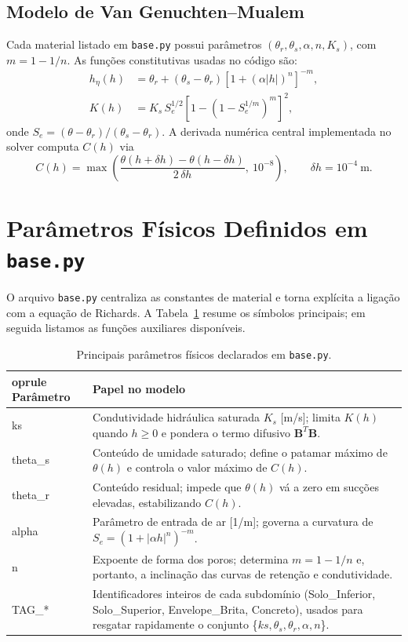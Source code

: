 \documentclass[a4paper,12pt]{article}
\begin{document}
\subsection{Modelo de Van Genuchten--Mualem}
Cada material listado em \texttt{base.py} possui parâmetros $(\theta_r,\theta_s,\alpha,n,K_s)$, com $m = 1 - 1/n$. As funções constitutivas usadas no código são:
\begin{align}
    	h_{\eta}(h) &= \theta_r + (\theta_s - \theta_r)\left[1 + (\alpha |h|)^n\right]^{-m},\\
    K(h) &= K_s\, S_e^{1/2}\left[1 - \left(1 - S_e^{1/m}\right)^m\right]^2,
\end{align}
onde $S_e = (\theta - \theta_r)/(\theta_s - \theta_r)$. A derivada numérica central implementada no solver computa $C(h)$ via
\begin{equation}
    C(h) = \max\left( \frac{\theta(h + \delta h) - \theta(h - \delta h)}{2\,\delta h} ,\ 10^{-8} \right), \qquad \delta h = 10^{-4}\ \text{m}.
\end{equation}

\section{Parâmetros Físicos Definidos em \texttt{base.py}}
O arquivo \texttt{base.py} centraliza as constantes de material e torna explícita a ligação com a equação de Richards. A Tabela~\ref{tab:parametros-base} resume os símbolos principais;
em seguida listamos as funções auxiliares disponíveis.

\begin{table}[h!]
    \centering
    \begin{tabular}{>{\ttfamily}l p{}}
        	oprule
        Parâmetro & Papel no modelo \\
        \midrule
        ks & Condutividade hidráulica saturada $K_s$ [m/s]; limita $K(h)$ quando $h\ge 0$ e pondera o termo difusivo $\mathbf{B}^T \mathbf{B}$. \\
        theta\_s & Conteúdo de umidade saturado; define o patamar máximo de $\theta(h)$ e controla o valor máximo de $C(h)$. \\
        theta\_r & Conteúdo residual; impede que $\theta(h)$ vá a zero em sucções elevadas, estabilizando $C(h)$. \\
        alpha & Parâmetro de entrada de ar [1/m]; governa a curvatura de $S_e = (1 + |\alpha h|^n)^{-m}$. \\
        n & Expoente de forma dos poros; determina $m = 1 - 1/n$ e, portanto, a inclinação das curvas de retenção e condutividade. \\
        TAG\_* & Identificadores inteiros de cada subdomínio (Solo\_Inferior, Solo\_Superior, Envelope\_Brita, Concreto), usados para resgatar rapidamente o conjunto \{$ks, \theta_s, \theta_r, \alpha, n$\}. \\
        \bottomrule
    \end{tabular}
    \caption{Principais parâmetros físicos declarados em \texttt{base.py}.}
    \label{tab:parametros-base}
\end{table}
\end{document}
